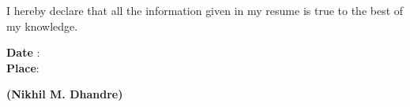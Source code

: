 \documentclass[a4paper,11pt]{memoir} %
\begin{document}
\vspace{1cm}
I hereby declare that all the information given in my resume is true to the best of my knowledge.
\vspace{1cm}
\begin{flushleft}
\textbf{\small Date} \hspace{0.20cm}:\, \\
\textbf{\small Place}\hspace{0.21cm}:\,    
\end{flushleft}

\begin{flushright}
\textbf{(\small Nikhil M. Dhandre)} 
\end{flushright}
\end{document}
